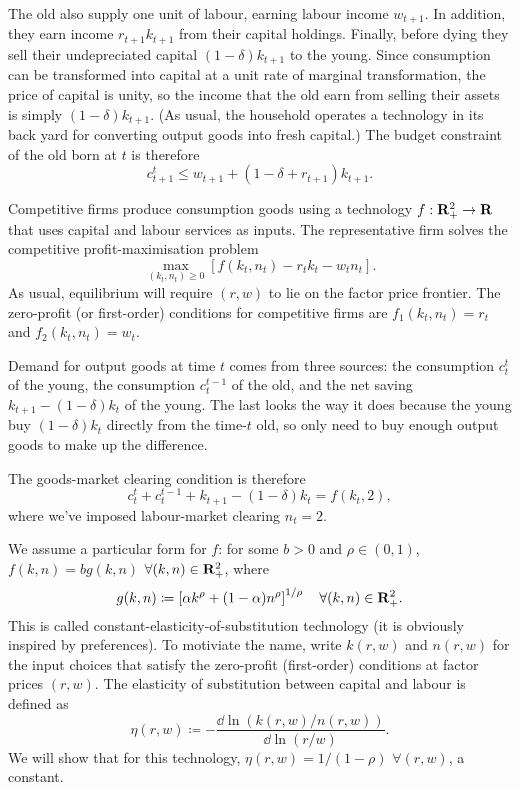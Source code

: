 \documentclass[11pt,letterpaper,reqno,oneside]{article}
\begin{document}
The old also supply one unit of labour, earning labour income $w_{t+1}$. In addition, they earn income $r_{t+1} k_{t+1}$ from their capital holdings. Finally, before dying they sell their undepreciated capital $(1-\delta)k_{t+1}$ to the young. Since consumption can be transformed into capital at a unit rate of marginal transformation, the price of capital is unity, so the income that the old earn from selling their assets is simply $(1-\delta)k_{t+1}$. (As usual, the household operates a technology in its back yard for converting output goods into fresh capital.) The budget constraint of the old born at $t$ is therefore
%
\begin{equation*}
	c^t_{t+1} \leq w_{t+1} + ( 1 - \delta + r_{t+1} ) k_{t+1} .
\end{equation*}


Competitive firms produce consumption goods using a technology $f : \mathbf{R}_+^2 \to \mathbf{R}$ that uses capital and labour services as inputs. The representative firm solves the competitive profit-maximisation problem
%
\begin{equation*}
	\max_{(k_t,n_t) \geq 0} \left[
	f(k_t,n_t) - r_t k_t - w_t n_t \right] .
\end{equation*}
%
As usual, equilibrium will require $(r,w)$ to lie on the factor price frontier. The zero-profit (or first-order) conditions for competitive firms are $f_1(k_t,n_t) = r_t$ and $f_2(k_t,n_t) = w_t$.


Demand for output goods at time $t$ comes from three sources: the consumption $c^t_t$ of the young, the consumption $c^{t-1}_t$ of the old, and the net saving $k_{t+1} - (1-\delta) k_t$ of the young. The last looks the way it does because the young buy $(1-\delta)k_t$ directly from the time-$t$ old, so only need to buy enough output goods to make up the difference.


The goods-market clearing condition is therefore
%
\begin{equation*}
	c^t_t + c^{t-1}_t + k_{t+1} - (1-\delta) k_t = f(k_t,2) ,
\end{equation*}
%
where we've imposed labour-market clearing $n_t = 2$.



We assume a particular form for $f$: for some $b>0$ and $\rho \in (0,1)$, $f(k,n) = b g(k,n)$ $\forall(k,n) \in \mathbf{R}_+^2$, where
%
\begin{equation*}
	g(k,n) \coloneqq \left[ \alpha k^\rho + (1-\alpha) n^\rho \right]^{1/\rho}
	\quad\forall(k,n) \in \mathbf{R}_+^2 .
\end{equation*}
%
This is called constant-elasticity-of-substitution technology (it is obviously inspired by \textcite{DixitStiglitz1977} preferences). To motiviate the name, write $k(r,w)$ and $n(r,w)$ for the input choices that satisfy the zero-profit (first-order) conditions at factor prices $(r,w)$. The elasticity of substitution between capital and labour is defined as
%
\begin{equation*}
	\eta(r,w) 
	\coloneqq - \frac{ \dd \ln( k(r,w)/n(r,w) ) }{ \dd \ln( r/w ) } .
\end{equation*}
%
We will show that for this technology, $\eta(r,w) = 1/(1-\rho)$ $\forall (r,w)$, a constant.
\end{document}
